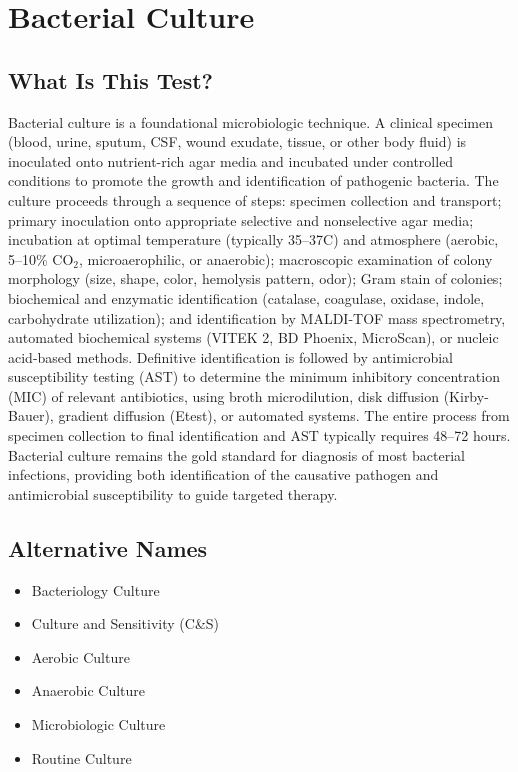 \chapter{Bacterial Culture}

\section*{What Is This Test?}
Bacterial culture is a foundational microbiologic technique. A clinical specimen (blood, urine, sputum, CSF, wound exudate, tissue, or other body fluid) is inoculated onto nutrient-rich agar media and incubated under controlled conditions to promote the growth and identification of pathogenic bacteria. The culture proceeds through a sequence of steps: specimen collection and transport; primary inoculation onto appropriate selective and nonselective agar media; incubation at optimal temperature (typically 35--37\textdegree{}C) and atmosphere (aerobic, 5--10\% CO$_2$, microaerophilic, or anaerobic); macroscopic examination of colony morphology (size, shape, color, hemolysis pattern, odor); Gram stain of colonies; biochemical and enzymatic identification (catalase, coagulase, oxidase, indole, carbohydrate utilization); and identification by MALDI-TOF mass spectrometry, automated biochemical systems (VITEK 2, BD Phoenix, MicroScan), or nucleic acid-based methods. Definitive identification is followed by antimicrobial susceptibility testing (AST) to determine the minimum inhibitory concentration (MIC) of relevant antibiotics, using broth microdilution, disk diffusion (Kirby-Bauer), gradient diffusion (Etest), or automated systems. The entire process from specimen collection to final identification and AST typically requires 48--72 hours. Bacterial culture remains the gold standard for diagnosis of most bacterial infections, providing both identification of the causative pathogen and antimicrobial susceptibility to guide targeted therapy.

\section*{Alternative Names}
\begin{itemize}
  \item Bacteriology Culture
  \item Culture and Sensitivity (C\&S)
  \item Aerobic Culture
  \item Anaerobic Culture
  \item Microbiologic Culture
  \item Routine Culture
\end{itemize}
